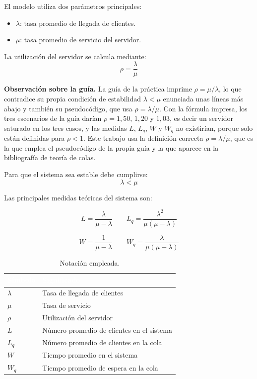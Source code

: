 \documentclass[11pt,a4paper]{article}
\renewcommand{\arraystretch}{1.08}
\begin{document}
El modelo utiliza dos parámetros principales:
\begin{itemize}
    \item $\lambda$: tasa promedio de llegada de clientes.
    \item $\mu$: tasa promedio de servicio del servidor.
\end{itemize}

La utilización del servidor se calcula mediante:
\[
\rho = \frac{\lambda}{\mu}
\]

\noindent\textbf{Observación sobre la guía.} La guía de la práctica imprime
$\rho = \mu/\lambda$, lo que contradice su propia condición de estabilidad
$\lambda < \mu$ enunciada unas líneas más abajo y también su pseudocódigo, que usa
$\rho = \lambda/\mu$. Con la fórmula impresa, los tres escenarios de la guía darían
$\rho = 1{,}50$, $1{,}20$ y $1{,}03$, es decir un servidor saturado en los tres casos, y
las medidas $L$, $L_q$, $W$ y $W_q$ no existirían, porque solo están definidas para
$\rho < 1$. Este trabajo usa la definición correcta $\rho = \lambda/\mu$, que es la que
emplea el pseudocódigo de la propia guía y la que aparece en la bibliografía de teoría
de colas.

Para que el sistema sea estable debe cumplirse:
\[
\lambda < \mu
\]

Las principales medidas teóricas del sistema son:

\[
L = \frac{\lambda}{\mu-\lambda} \qquad
L_q = \frac{\lambda^2}{\mu(\mu-\lambda)}
\]

\[
W = \frac{1}{\mu-\lambda} \qquad
W_q = \frac{\lambda}{\mu(\mu-\lambda)}
\]

\begin{table}[h!]
\centering
\setlength{\arrayrulewidth}{0.75pt}
\renewcommand{\arraystretch}{1.25}
\begin{tabular}{|l|l|}
\hline
\rowcolor{headerblue}
\textbf{\textcolor{white}{Símbolo}} & \textbf{\textcolor{white}{Significado}} \\ \hline
$\lambda$ & Tasa de llegada de clientes \\ \hline
\rowcolor{rowlight}
$\mu$ & Tasa de servicio \\ \hline
$\rho$ & Utilización del servidor \\ \hline
\rowcolor{rowlight}
$L$ & Número promedio de clientes en el sistema \\ \hline
$L_q$ & Número promedio de clientes en la cola \\ \hline
\rowcolor{rowlight}
$W$ & Tiempo promedio en el sistema \\ \hline
$W_q$ & Tiempo promedio de espera en la cola \\ \hline
\end{tabular}
\caption{Notación empleada.}
\end{table}
\end{document}
